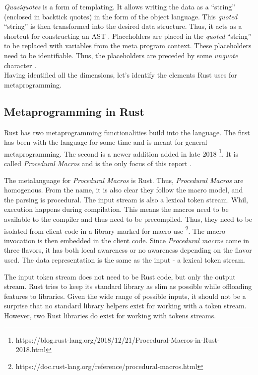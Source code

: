 \textit{Quasiquotes} is a form of templating.
It allows writing the data as a ``string'' (enclosed in backtick quotes) in the form of the object language.
This \textit{quoted} ``string'' is then transformed into the desired data structure.
Thus, it acts as a shortcut for constructing an AST \cite{lilis_15_01}.
Placeholders are placed in the \textit{quoted} ``string'' to be replaced with variables from the meta program context.
These placeholders need to be identifiable.
Thus, the placeholders are preceded by some \textit{unquote} character \cite{bawden_99_01}.\\

Having identified all the dimensions, let's identify the elements Rust uses for metaprogramming.

\subsection{Metaprogramming in Rust}
Rust has two metaprogramming functionalities build into the language.
The first has been with the language for some time and is meant for general metaprogramming.
The second is a newer addition added in late 2018 \footnote{https://blog.rust-lang.org/2018/12/21/Procedural-Macros-in-Rust-2018.html}.
It is called \textit{Procedural Macros} and is the only focus of this report \cite{klabnik_2019_01}.

The metalanguage for \textit{Procedural Macros} is Rust.
Thus, \textit{Procedural Macros} are homogenous.
From the name, it is also clear they follow the macro model, and the parsing is procedural.
The input stream is also a lexical token stream.
Whil, execution happens during compilation.
This means the macros need to be available to the compiler and thus need to be precompiled.
Thus, they need to be isolated from client code in a library marked for macro use \footnote{https://doc.rust-lang.org/reference/procedural-macros.html}.
The macro invocation is then embedded in the client code.
Since \textit{Procedural macros} come in three flavors, it has both local awareness or no awareness depending on the flavor used.
The data representation is the same as the input - a lexical token stream.

The input token stream does not need to be Rust code, but only the output stream.
Rust tries to keep its standard library as slim as possible while offloading features to libraries.
Given the wide range of possible inputs, it should not be a surprise that no standard library helpers exist for working with a token stream.
However, two Rust libraries do exist for working with tokens streams.

